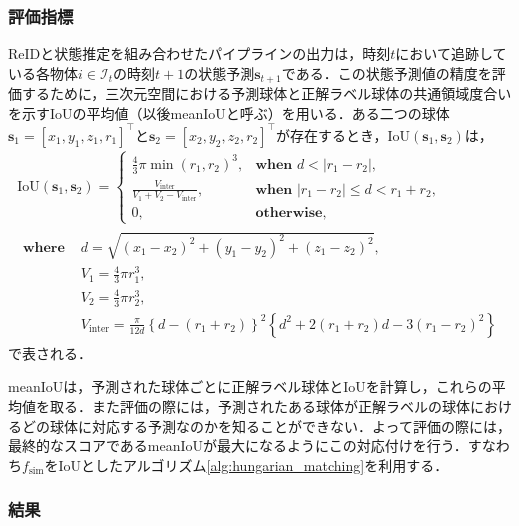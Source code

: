 \subsubsection{評価指標}

ReIDと状態推定を組み合わせたパイプラインの出力は，時刻$t$において追跡している各物体$i \in \mathcal{I}_t$の時刻$t+1$の状態予測$\bm{s}_{t+1}$である．この状態予測値の精度を評価するために，三次元空間における予測球体と正解ラベル球体の共通領域度合いを示すIoUの平均値（以後meanIoUと呼ぶ）を用いる．ある二つの球体$\bm{s}_1 = [x_1, y_1, z_1, r_1]^{\top}$と$\bm{s}_2 = [x_2, y_2, z_2, r_2]^{\top}$が存在するとき，IoU$(\bm{s}_1, \bm{s}_2)$は，
\begin{equation}
    \label{eq:sphere_iou}
    \begin{gathered}
        \text{IoU}(\bm{s}_1, \bm{s}_2) = 
        \begin{cases}
            \frac{4}{3} \pi \min(r_1, r_2)^3, & \textbf{when } d < \left|r_1 - r_2\right|,
            \\ \frac{V_{\text{inter}}}{V_1 + V_2 - V_{\text{inter}}} , & \textbf{when } \left|r_1 - r_2\right| \leq d < r_1 + r_2,
            \\ 0, & \textbf{otherwise},
        \end{cases}
        \\
        \begin{aligned}
            \textbf{where } &d = \sqrt{(x_1 - x_2)^2 + (y_1 - y_2)^2 + (z_1 - z_2)^2},
            \\ &V_1 = \frac{4}{3} \pi r_1^3,
            \\ &V_2 = \frac{4}{3} \pi r_2^3,
            \\ &V_{\text{inter}} = \frac{\pi}{12 d} \left\{d - (r_1 + r_2)\right\}^2 \left\{d^2 + 2(r_1 + r_2)d - 3 (r_1 - r_2)^2\right\}
        \end{aligned}
    \end{gathered}
\end{equation}
で表される．

meanIoUは，予測された球体ごとに正解ラベル球体とIoUを計算し，これらの平均値を取る．また評価の際には，予測されたある球体が正解ラベルの球体におけるどの球体に対応する予測なのかを知ることができない．よって評価の際には，最終的なスコアであるmeanIoUが最大になるようにこの対応付けを行う．すなわち$f_{\text{sim}}$をIoUとしたアルゴリズム\ref{alg:hungarian_matching}を利用する．

\subsubsection{結果}

